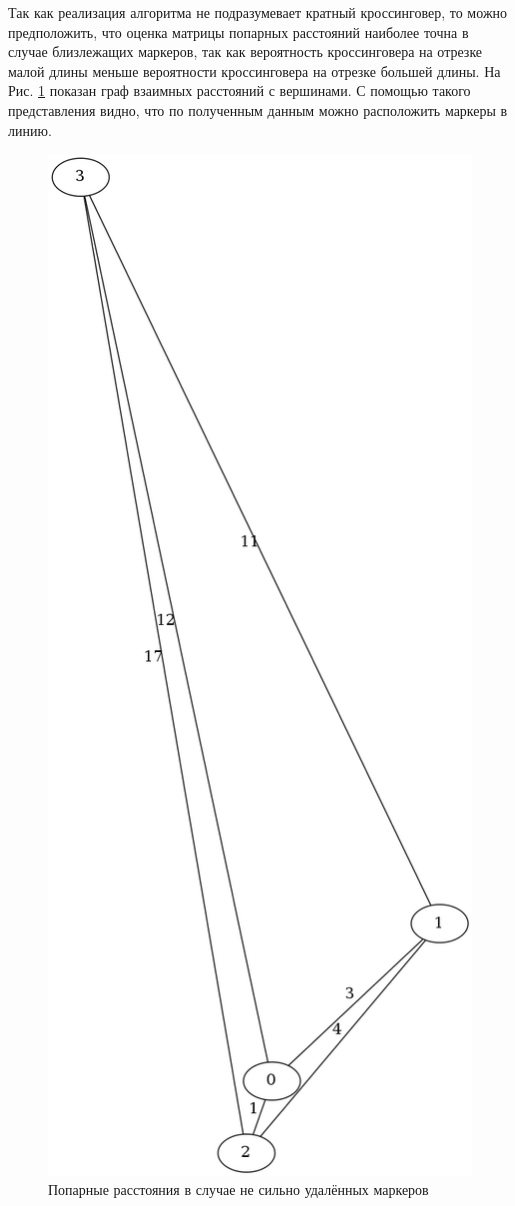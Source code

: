 \documentclass{matmex-diploma-custom}
\begin{document}
Так как реализация алгоритма не подразумевает кратный кроссинговер, то
можно предположить, что оценка матрицы попарных расстояний наиболее
точна в случае близлежащих маркеров, так как вероятность кроссинговера
на отрезке малой длины меньше вероятности кроссинговера на отрезке
большей длины. На Рис. \ref{fig:fig1} показан граф взаимных расстояний
с вершинами. С помощью такого представления видно, что по полученным
данным можно расположить маркеры в линию.
\begin{figure}[h]
 \centering
  \includegraphics[width=1.0\textwidth]{good.png}
  \caption[width=0.8\textwidth]{Попарные расстояния в случае не сильно
    удалённых маркеров}
  \label{fig:fig1}
\end{figure}
\end{document}
